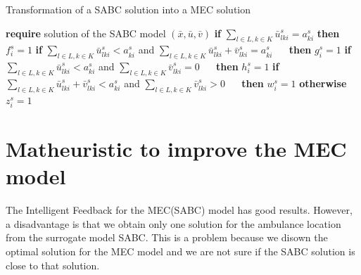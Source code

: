  
\begin{algorithm}
\caption{Transformation of a SABC solution into a MEC solution }\label{alg:cap}
\begin{algorithmic}[1]
\State \textbf{require} solution of the SABC model $(\bar{x},\bar{u},\bar{v})$
    \State \textbf{if } $\sum_{l\in L,k\in K} \bar{u}^s_{lki}= a^s_{ki}$ \textbf{then}  $f^s_i=1$ 
    \State \textbf{if} $\sum_{l\in L,k\in K} \bar{u}^s_{lki}  < a^s_{ki}$ and $ \sum_{l\in L,k\in K} \bar{u}^s_{lki} +\bar{v}^s_{lki} = a^s_{ki}$ 
    \State $\quad $ \textbf{then} $g^s_i=1$ 
    \State \textbf{if } $ \sum_{l\in L,k\in K} \bar{u}^s_{lki}  < a^s_{ki}$ and $\sum_{l\in L,k\in K}\bar{v}^s_{lki}=0$ 
    \State $\quad $ \textbf{then} $h^s_i=1$ 
    \State \textbf{if} $ \sum_{l\in L,k\in K} \bar{u}^s_{lki} +\bar{v}^s_{lki} < a^s_{ki}$ and $\sum_{l\in L,k\in K}\bar{v}^s_{lki}>0$ 
    \State $\quad $ \textbf{then} $w^s_i=1$ 
    \State \textbf{otherwise} $z^s_i=1$ 
\EndFor
{}
\end{algorithmic}
\end{algorithm}

\section{Matheuristic to improve the MEC model}
The Intelligent Feedback for the MEC(SABC) model has good results. However, a disadvantage is that we obtain only one solution for the ambulance location from the surrogate model SABC. This is a problem because we disown the optimal solution for the MEC model and we are not sure if the SABC solution is close to that solution.

